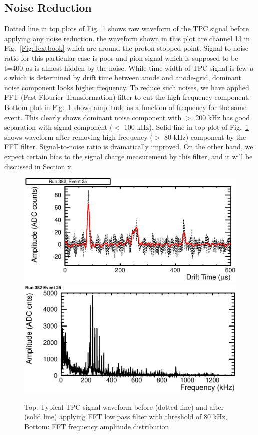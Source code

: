 \subsection{Noise Reduction}
Dotted line in top plots of Fig.~\ref{Fig:FFT} shows raw waveform of the TPC signal
before applying any noise reduction. the waveform shown in this plot
are channel 13 in Fig.~\ref{Fig:Textbook} which are around the proton stopped point.
Signal-to-noise ratio for this particular case is poor and pion signal 
which is supposed to be t=400 $\mu$s is almost hidden by the noise. 
While time width of TPC signal is few $\mu$s which is determined by
drift time between anode and anode-grid, dominant noise component looks
higher frequency. To reduce such noises, we have applied FFT 
(Fast Flourier Transformation) filter to cut the high frequency component.
Bottom plot in Fig.~\ref{Fig:FFT} shows amplitude as a function of frequency
for the same event. This clearly shows dominant noise component with
$>$ 200 kHz has good separation with signal component ($<$ 100 kHz).
Solid line in top plot of Fig.~\ref{Fig:FFT} shows waveform after removing high frequency
($>$ 80 kHz) component by the FFT filter. Signal-to-noise ratio is dramatically
improved. On the other hand, we expect certain bias to the signal charge
measurement by this filter, and it will be discussed in Section x.

\begin{figure}[htbp]
 \begin{center}
  \includegraphics[width=1.0\hsize]{fig/beforeafterFFT.eps}
  \includegraphics[width=1.0\hsize]{fig/FFT.eps}
 \end{center}
 \caption{Top: Typical TPC signal waveform before (dotted line) and after (solid line) applying FFT low pass filter with threshold of 80 kHz,
Bottom: FFT frequency amplitude distribution}
 \label{Fig:FFT}
\end{figure}

